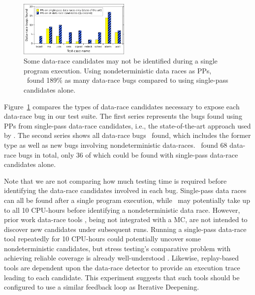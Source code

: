 \begin{figure}[t]
	\includegraphics[width=0.48\textwidth]{nondet-drs-1-v2.pdf}
	\caption{Some data-race candidates may not be identified during a single program execution.
		Using nondeterministic data races as PPs,
		\quicksand~found 189\% as many data-race bugs compared to using single-pass candidates alone.
	}
	\label{fig:dr-falsenegs}
\end{figure}
Figure~\ref{fig:dr-falsenegs} compares the types of data-race candidates necessary to expose each data-race bug in our test suite.
The first series represents the bugs found using PPs from single-pass data-race candidates,
i.e., the state-of-the-art approach used by \cite{racefuzzer,portend}.
The second series shows all data-race bugs \quicksand~found,
which includes the former type as well as new bugs involving nondeterministic data-races.
\quicksand~found 68 data-race bugs in total, only 36 of which could be found with single-pass data-race candidates alone.

Note that we are not comparing how much testing time is required before identifying the data-race candidates involved in each bug.
Single-pass data races can all be found after a single program execution,
while \quicksand~may potentially take up to all 10 CPU-hours before identifying a nondeterministic data race.
However, prior work data-race tools \cite{tsan}, being not integrated with a MC,
are not intended to discover new candidates under subsequent runs.
Running a single-pass data-race tool repeatedly for 10 CPU-hours could potentially uncover some nondeterministic candidates,
but stress testing's comparative problem with achieving reliable coverage is already well-understood
\cite{chess-icb,gambit}.
Likewise, replay-based tools \cite{portend} are dependent upon the data-race detector to provide an execution trace leading to each candidate.
This experiment suggests that
such tools should be configured to use a similar feedback loop as Iterative Deepening.


